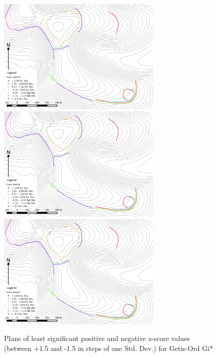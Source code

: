 \begin{figure}
\centering
	\includegraphics[width=0.7\textwidth]{figures/hotspot-3}
	\includegraphics[width=0.7\textwidth]{figures/hotspot-4}
	\includegraphics[width=0.7\textwidth]{figures/hotspot-5}
  \caption{Plans of least significant positive and negative z-score values (between +1.5 and -1.5 in steps of one Std. Dev.)  for Getis-Ord Gi*}
  \label{fig:hotspot-3}
\end{figure}

